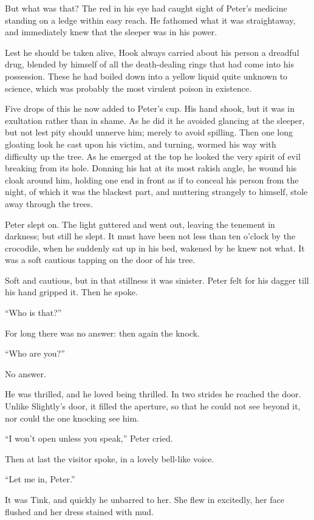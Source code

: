 But what was that?
The red in his eye had caught sight of Peter’s medicine standing on a ledge within easy reach.
He fathomed what it was straightaway, and immediately knew that the sleeper was in his power.

Lest he should be taken alive, Hook always carried about his person a dreadful drug,
blended by himself of all the death-dealing rings that had come into his possession.
These he had boiled down into a yellow liquid quite unknown to science,
which was probably the most virulent poison in existence.

Five drops of this he now added to Peter’s cup.
His hand shook, but it was in exultation rather than in shame.
As he did it he avoided glancing at the sleeper, but not lest pity should unnerve him;
merely to avoid spilling.
Then one long gloating look he cast upon his victim, and turning, wormed his way with difficulty up the tree.
As he emerged at the top he looked the very spirit of evil breaking from its hole.
Donning his hat at its most rakish angle,
he wound his cloak around him,
holding one end in front as if to conceal his person from the night, of which it was the blackest part,
and muttering strangely to himself, stole away through the trees.

Peter slept on.
The light guttered and went out, leaving the tenement in darkness;
but still he slept.
It must have been not less than ten o’clock by the crocodile,
when he suddenly sat up in his bed, wakened by he knew not what.
It was a soft cautious tapping on the door of his tree.

Soft and cautious, but in that stillness it was sinister.
Peter felt for his dagger till his hand gripped it.
Then he spoke.

“Who is that?”

For long there was no answer:
then again the knock.

“Who are you?”

No answer.

He was thrilled, and he loved being thrilled.
In two strides he reached the door.
Unlike Slightly’s door, it filled the aperture,
so that he could not see beyond it, nor could the one knocking see him.

“I won’t open unless you speak,” Peter cried.

Then at last the visitor spoke, in a lovely bell-like voice.

“Let me in, Peter.”

It was Tink, and quickly he unbarred to her.
She flew in excitedly, her face flushed and her dress stained with mud.

